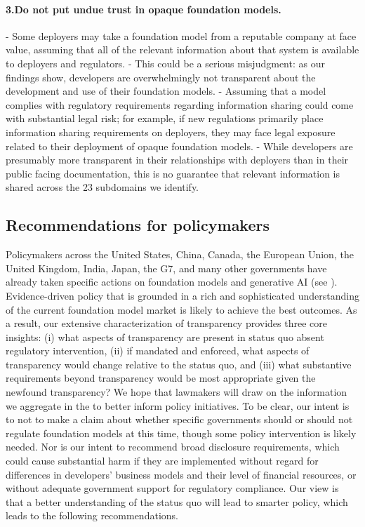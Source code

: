  \paragraph{3.\phantom{X}Do not put undue trust in opaque foundation models.} 
-  Some deployers may take a foundation model from a reputable company at face value, assuming that all of the relevant information about that system is available to deployers and regulators.
- This could be a serious misjudgment: as our findings show, developers are overwhelmingly not transparent about the development and use of their foundation models.
- Assuming that a model complies with regulatory requirements regarding information sharing could come with substantial legal risk; for example, if new regulations primarily place information sharing requirements on deployers, they may face legal exposure related to their deployment of opaque foundation models.
- While developers are presumably more transparent in their relationships with deployers than in their public facing documentation, this is no guarantee that relevant information is shared across the 23 subdomains we identify.
\clearpage
\hypertarget{recommendations-policy}{\subsection{Recommendations for policymakers}}
\label{sec:recommendations-policy}

Policymakers across the United States, China, Canada, the European Union, the United Kingdom, India, Japan, the G7, and many other governments have already taken specific actions on foundation models and generative AI (see ).
Evidence-driven policy that is grounded in a rich and sophisticated understanding of the current foundation model market is likely to achieve the best outcomes.
As a result, our extensive characterization of transparency provides three core insights: (i) what aspects of transparency are present in status quo absent regulatory intervention, (ii) if mandated and enforced, what aspects of transparency would change relative to the status quo, and (iii) what substantive requirements beyond transparency would be most appropriate given the newfound transparency?
We hope that lawmakers will draw on the information we aggregate in the \projectname to better inform policy initiatives.
To be clear, our intent is to not to make a claim about whether specific governments should or should not regulate foundation models at this time, though some policy intervention is likely needed. 
Nor is our intent to recommend broad disclosure requirements, which could cause substantial harm if they are implemented without regard for differences in developers' business models and their level of financial resources, or without adequate government support for regulatory compliance.
Our view is that a better understanding of the status quo will lead to smarter policy, which leads to the following recommendations.


